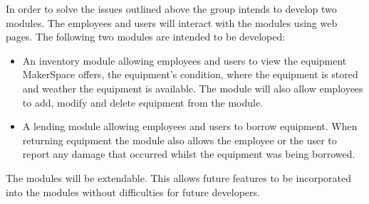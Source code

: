 In order to solve the issues outlined above the group intends to develop two modules.
The employees and users will interact with the modules using web pages.
The following two modules are intended to be developed:
\begin{itemize}
    \item An inventory module allowing employees and users to view the equipment MakerSpace offers, the equipment's condition, where the equipment is stored and weather the equipment is available.
    The module will also allow employees to add, modify and delete equipment from the module.
    \item A lending module allowing employees and users to borrow equipment.
    When returning equipment the module also allows the employee or the user to report any damage that occurred whilst the equipment was being borrowed.
\end{itemize}

The modules will be extendable.
This allows future features to be incorporated into the modules without difficulties for future developers.






